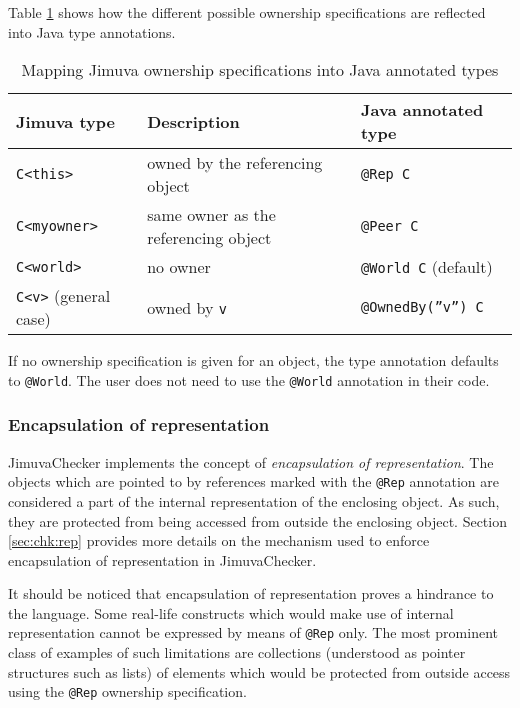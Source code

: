 \documentclass{pracamgr}
\theoremstyle{break}
\theoremstyle{break}
\theoremstyle{break}
\begin{document}
Table \ref{tab:mapping-owner} shows how the different possible
ownership specifications are reflected into Java type annotations.
\begin{table}
  \centering
  \begin{tabular}{|l|l|l|}
    \hline
    \textbf{Jimuva type} & \textbf{Description} & \textbf{Java annotated type} \\
    \hline \hline 
    \texttt{C<this>} & owned by the referencing object & \texttt{@Rep C} \\
    \texttt{C<myowner>} & same owner as the referencing object & \texttt{@Peer C} \\
    \texttt{C<world>} & no owner & \texttt{@World C} (default) \\
    \texttt{C<v>} (general case) & owned by \texttt{v} & \texttt{@OwnedBy(''v'') C} \\
    \hline
  \end{tabular}
  \caption{Mapping Jimuva ownership specifications into Java annotated types}
  \label{tab:mapping-owner}
\end{table}
If no ownership specification is given for an object, the type
annotation defaults to \texttt{@World}. The user does not need to use
the \texttt{@World} annotation in their code.

\subsubsection{Encapsulation of representation}
\label{sec:mod:encap}

JimuvaChecker implements the concept of \emph{encapsulation of
  representation}. The objects which are pointed to by references
marked with the \texttt{@Rep} annotation are considered a part of the
internal representation of the enclosing object. As such, they are
protected from being accessed from outside the enclosing
object. Section \ref{sec:chk:rep} provides more details on the
mechanism used to enforce encapsulation of representation in
JimuvaChecker. 

It should be noticed that encapsulation of representation proves a
hindrance to the language. Some real-life constructs which would make
use of internal representation cannot be expressed by means of
\texttt{@Rep} only. The most prominent class of examples of such
limitations are collections (understood as pointer structures such as
lists) of elements which would be protected from outside access using
the \texttt{@Rep} ownership specification.


\end{document}
